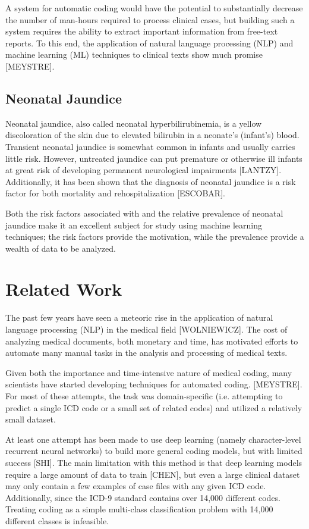 \documentclass[conference]{IEEEtran}
\begin{document}
A system for automatic coding would have the potential to substantially decrease the number of man-hours required to process clinical cases, but building such a system requires the ability to extract important information from free-text reports. To this end, the application of natural language processing (NLP) and machine learning (ML) techniques to clinical texts show much promise [MEYSTRE].

\subsection{Neonatal Jaundice}\label{AA}
Neonatal jaundice, also called neonatal hyperbilirubinemia, is a yellow discoloration of the skin due to elevated bilirubin in a neonate's (infant's) blood. Transient neonatal jaundice is somewhat common in infants and usually carries little risk. However, untreated jaundice can put premature or otherwise ill infants at great risk of developing permanent neurological impairments [LANTZY]. Additionally, it has been shown that the diagnosis of neonatal jaundice is a risk factor for both mortality and rehospitalization [ESCOBAR]. 

Both the risk factors associated with and the relative prevalence of neonatal jaundice make it an excellent subject for study using machine learning techniques; the risk factors provide the motivation, while the prevalence provide a wealth of data to be analyzed.

\section{Related Work}
The past few years have seen a meteoric rise in the application of natural language processing (NLP) in the medical field [WOLNIEWICZ]. The cost of analyzing medical documents, both monetary and time, has motivated efforts to automate many manual tasks in the analysis and processing of medical texts.

Given both the importance and time-intensive nature of medical coding, many scientists have started developing techniques for automated coding. [MEYSTRE]. For most of these attempts, the task was domain-specific (i.e. attempting to predict a single ICD code or a small set of related codes) and utilized a relatively small dataset. 

At least one attempt has been made to use deep learning (namely character-level recurrent neural networks) to build more general coding models, but with limited success [SHI]. The main limitation with this method is that deep learning models require a large amount of data to train [CHEN], but even a large clinical dataset may only contain a few examples of case files with any given ICD code. Additionally, since the ICD-9 standard contains over 14,000 different codes. Treating coding as a simple multi-class classification problem with 14,000 different classes is infeasible.
\end{document}
